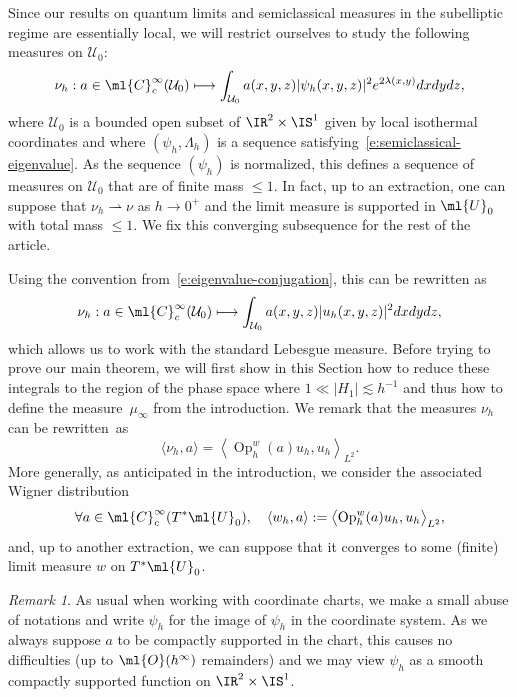 \documentclass[JEP,XML,SOM,Unicode, NoEqCountersInSection,published]{cedram}
\newcommand\mto{\mathchoice{\longmapsto}{\mapsto}{\mapsto}{\mapsto}}
\theoremstyle{plain}
\theoremstyle{definition}
\theoremstyle{remark}
\newtheorem{rema}[theo]{Remark}
\newcommand{\Op}{\operatorname{Op}}
\begin{document}
Since our results on quantum limits and semiclassical measures in the subelliptic regime are essentially local, we will restrict ourselves to study the following measures on $\mathcal{U}_0$:
\[
\nu_h:a\in\ml{C}^\infty_c(\mathcal{U}_0)\mto \int_{\mathcal{U}_0} a(x,y,z)|\psi_h(x,y,z)|^2e^{2\lambda(x,y)}dxdydz,
\]
where $\mathcal{U}_0$ is a bounded open subset of $\IR^2\times\IS^1$ given by local isothermal coordinates and where $(\psi_h,\Lambda_h)$ is a sequence satisfying~\eqref{e:semiclassical-eigenvalue}. As the sequence $(\psi_h)$ is normalized, this defines a sequence of measures on $\mathcal{U}_0$ that are of finite mass $\leq 1$. In fact, up to an extraction, one can suppose that $\nu_h\rightharpoonup\nu$ as $h\to 0^+$ and the limit measure is supported in $\ml{U}_0$ with total mass $\leq 1$. We fix this converging subsequence for the rest of the article.

Using the convention from~\eqref{e:eigenvalue-conjugation}, this can be rewritten as
\[
\nu_h:a\in\ml{C}^\infty_c(\mathcal{U}_0)\mto \int_{\mathcal{U}_0} a(x,y,z)|u_h(x,y,z)|^2dxdydz,
\]
which allows us to work with the standard Lebesgue measure. Before trying to prove our main theorem, we will first show in this Section how to reduce these integrals to the region of the phase space where $1\ll |H_1|\lesssim h^{-1}$ and thus how to define the measure~$\mu_\infty$ from the introduction. We remark that the measures $\nu_h$ can be rewritten~as
\begin{equation}\label{e:measure-pseudo}
\langle\nu_h,a\rangle=\left\langle \Op_h^w(a)u_h,u_h\right\rangle_{L^2}.
\end{equation}
More generally, as anticipated in the introduction, we consider the associated Wigner distribution
\begin{equation}%
\forall a\in\ml{C}^{\infty}_c(T^*\ml{U}_0),\quad\langle w_h,a\rangle: =\bigl\langle \Op_h^w(a)u_h,u_h\bigr\rangle_{L^2},
\end{equation}
and, up to another extraction, we can suppose that it converges to some (finite) limit measure $w$ on $T^*\ml{U}_0$.

\begin{rema} As usual when working with coordinate charts, we make a small abuse of notations and write $\psi_h$ for the image of $\psi_h$ in the coordinate system. As we always suppose $a$ to be compactly supported in the chart, this causes no difficulties (up to $\ml{O}(h^\infty)$ remainders) and we may view $\psi_h$ as a smooth compactly supported function on $\IR^2\times\IS^1$.
\end{rema}
\end{document}
